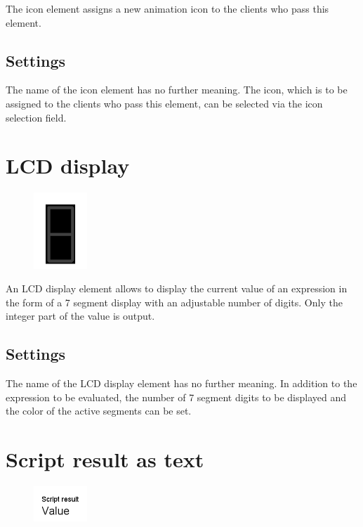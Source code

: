 The icon element assigns a new animation icon to the clients who pass this element.

\subsection*{Settings}

The name of the icon element has no further meaning. The icon, which is to be assigned to the
clients who pass this element, can be selected via the icon selection field.


\section{LCD display}
\label{ref:ModelElementAnimationLCD}

\begin{figure}
\vspace{-22pt}
\includegraphics[width=2cm]{imageModelElementAnimationLCD.png}
\vspace{-22pt}
\end{figure}

An LCD display element allows to display the current value of an expression
in the form of a 7 segment display with an adjustable number of digits.
Only the integer part of the value is output. 

\subsection*{Settings}

The name of the LCD display element has no further meaning.
In addition to the expression to be evaluated, the number of
7 segment digits to be displayed and the color of the active
segments can be set.


\section{Script result as text}
\label{ref:ModelElementAnimationTextJS}

\begin{figure}
\vspace{-22pt}
\includegraphics[width=2cm]{imageModelElementAnimationTextJS.png}
\vspace{-22pt}
\end{figure}

